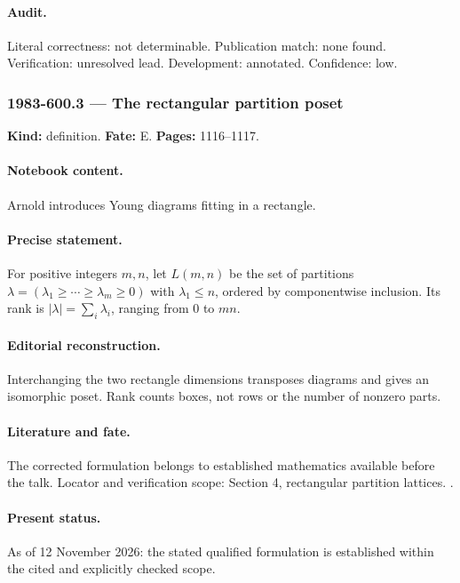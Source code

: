\paragraph{Audit.} Literal correctness: not determinable. Publication match: none found. Verification: unresolved lead. Development: annotated. Confidence: low.

\subsubsection{1983-600.3 --- The rectangular partition poset}

\label{item:1983-600.3}

\noindent\textbf{Kind:} definition. \textbf{Fate:} E. \textbf{Pages:} 1116--1117.\par

\paragraph{Notebook content.} Arnold introduces Young diagrams fitting in a rectangle.

\paragraph{Precise statement.} For positive integers \(m,n\), let \(L(m,n)\) be the set of partitions \(\lambda=(\lambda_1\ge\cdots\ge\lambda_m\ge0)\) with \(\lambda_1\le n\), ordered by componentwise inclusion. Its rank is \(|\lambda|=\sum_i\lambda_i\), ranging from 0 to \(mn\).

\paragraph{Editorial reconstruction.} Interchanging the two rectangle dimensions transposes diagrams and gives an isomorphic poset. Rank counts boxes, not rows or the number of nonzero parts.

\paragraph{Literature and fate.} The corrected formulation belongs to established mathematics available before the talk. Locator and verification scope: Section 4, rectangular partition lattices. \cite{stanley1980weyl}.

\paragraph{Present status.} As of 12 November 2026: the stated qualified formulation is established within the cited and explicitly checked scope.


